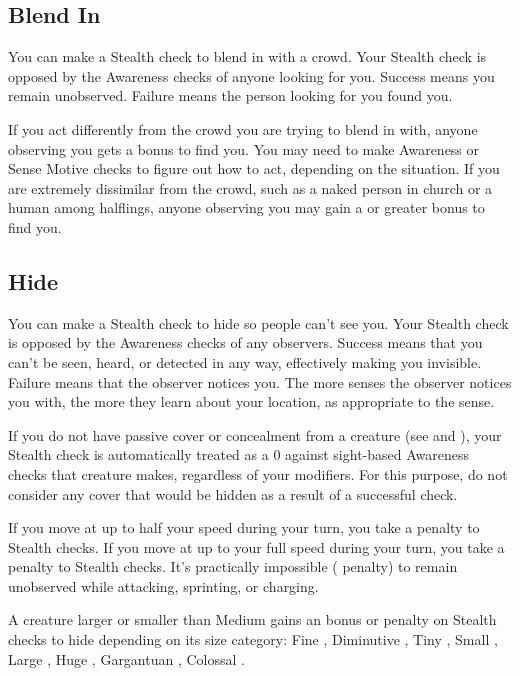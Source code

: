     \subsection{Blend In}
        You can make a Stealth check to blend in with a crowd. Your Stealth check is opposed by the Awareness checks of anyone looking for you. Success means you remain unobserved. Failure means the person looking for you found you.

        If you act differently from the crowd you are trying to blend in with, anyone observing you gets a  bonus to find you. You may need to make Awareness or Sense Motive checks to figure out how to act, depending on the situation. If you are extremely dissimilar from the crowd, such as a naked person in church or a human among halflings, anyone observing you may gain a  or greater bonus to find you.

    \subsection{Hide}
        You can make a Stealth check to hide so people can't see you. Your Stealth check is opposed by the Awareness checks of any observers. Success means that you can't be seen, heard, or detected in any way, effectively making you invisible. Failure means that the observer notices you. The more senses the observer notices you with, the more they learn about your location, as appropriate to the sense.

        If you do not have passive cover or concealment from a creature (see  and ), your Stealth check is automatically treated as a 0 against sight-based Awareness checks that creature makes, regardless of your modifiers. For this purpose, do not consider any cover that would be hidden as a result of a successful check.

        If you move at up to half your speed during your turn, you take a  penalty to Stealth checks. If you move at up to your full speed during your turn, you take a  penalty to Stealth checks. It's practically impossible ( penalty) to remain unobserved while attacking, sprinting, or charging.

        A creature larger or smaller than Medium gains an bonus or penalty on Stealth checks to hide depending on its size category: Fine , Diminutive , Tiny , Small , Large , Huge , Gargantuan , Colossal .

